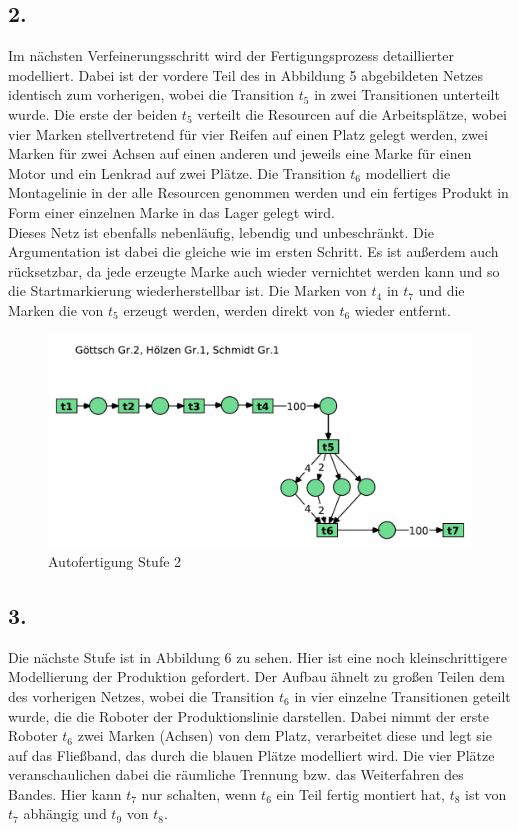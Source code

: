 \documentclass[12pt, paper=a4]{article}
\begin{document}
\subsection*{2.}
Im nächsten Verfeinerungsschritt wird der Fertigungsprozess detaillierter modelliert. Dabei ist der vordere Teil des in Abbildung 5 abgebildeten Netzes identisch zum vorherigen, wobei die Transition $t_5$ in zwei Transitionen unterteilt wurde. Die erste der beiden $t_5$ verteilt die Resourcen auf die Arbeitsplätze, wobei vier Marken stellvertretend für vier Reifen auf einen Platz gelegt werden, zwei Marken für zwei Achsen auf einen anderen und jeweils eine Marke für einen Motor und ein Lenkrad auf zwei Plätze. Die Transition $t_6$ modelliert die Montagelinie in der alle Resourcen genommen werden und ein fertiges Produkt in Form einer einzelnen Marke in das Lager gelegt wird.\\

Dieses Netz ist ebenfalls nebenläufig, lebendig und unbeschränkt. Die Argumentation ist dabei die gleiche wie im ersten Schritt. Es ist außerdem auch rücksetzbar, da jede erzeugte Marke auch wieder vernichtet werden kann und so die Startmarkierung wiederherstellbar ist. Die Marken von $t_4$ in $t_7$ und die Marken die von $t_5$ erzeugt werden, werden direkt von $t_6$ wieder entfernt.\\

\begin{figure}[h!]
\centering
\includegraphics[scale=0.7]{7-5-2.pdf}
\caption{Autofertigung Stufe 2}
\end{figure}

\subsection*{3.}
Die nächste Stufe ist in Abbildung 6 zu sehen. Hier ist eine noch kleinschrittigere Modellierung der Produktion gefordert. Der Aufbau ähnelt zu großen Teilen dem des vorherigen Netzes, wobei die Transition $t_6$ in vier einzelne Transitionen geteilt wurde, die die Roboter der Produktionslinie darstellen. Dabei nimmt der erste Roboter $t_6$ zwei Marken (Achsen) von dem Platz, verarbeitet diese und legt sie auf das Fließband, das durch die blauen Plätze modelliert wird. Die vier Plätze veranschaulichen dabei die räumliche Trennung bzw. das Weiterfahren des Bandes. Hier kann $t_7$ nur schalten, wenn $t_6$ ein Teil fertig montiert hat, $t_8$ ist von $t_7$ abhängig und $t_9$ von $t_8$.\\
\end{document}
